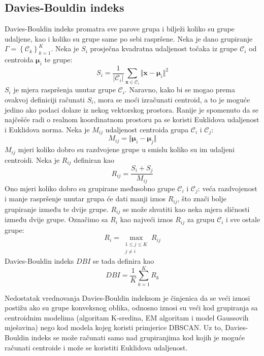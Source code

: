 \documentclass[times, utf8, zavrsni]{fer}
\begin{document}
\subsection{Davies-Bouldin indeks}
Davies-Bouldin indeks promatra sve parove grupa i bilježi koliko su grupe udaljene, kao i koliko su grupe same po sebi raspršene. Neka je dano grupiranje $\Gamma = \left\{\mathcal{C}_k\right\}_{k=1}^{K}$. Neka je $S_i$ prosječna kvadratna udaljenost točaka iz grupe $\mathcal{C}_i$ od centroida $\boldsymbol{\mu}_i$ te grupe:
\[S_i = \frac{1}{\left\vert \mathcal{C}_i \right\vert}
\sum_{\mathbf{x} \in \mathcal{C}_i} \Vert \mathbf{x} - \boldsymbol{\mu}_i  \Vert^2
\]
$S_i$ je mjera raspršenja unutar grupe $\mathcal{C}_i$. Naravno, kako bi se mogao prema ovakvoj definiciji računati $S_i$, mora se moći izračunati centroid, a to je moguće jedino ako podaci dolaze iz nekog vektorskog prostora. Ranije je spomenuto da se najčešće radi o realnom koordinatnom prostoru pa se koristi Euklidova udaljenost i Euklidova norma. Neka je $M_{ij}$ udaljenost centroida grupa $\mathcal{C}_i$ i $\mathcal{C}_j$:
\[M_{ij} = \Vert \boldsymbol{\mu}_i - \boldsymbol{\mu}_j \Vert\]
$M_{ij}$ mjeri koliko dobro su razdvojene grupe u smislu koliko su im udaljeni centroidi. Neka je $R_{ij}$ definiran kao
\[R_{ij} = \frac{S_i + S_j}{M_{ij}}\]
Ono mjeri koliko dobro su grupirane međusobno grupe $\mathcal{C}_i$ i $\mathcal{C}_j$: veća razdvojenost i manje raspršenje unutar grupa će dati manji iznos $R_{ij}$, što znači bolje grupiranje između te dvije grupe. $R_{ij}$ se može shvatiti kao neka mjera sličnosti između dvije grupe. Označimo sa $R_i$ kao najveći iznos $R_{ij}$ za grupu $\mathcal{C}_i$ i sve ostale grupe:
\[R_i = \max_{\substack{1 \leq j \leq K \\ j \neq i}} R_{ij}\]
Davies-Bouldin indeks $DBI$ se tada definira kao
\[DBI = \frac{1}{K} \sum_{k=1}^{K} R_k\]

Nedostatak vrednovanja Davies-Bouldin indeksom je činjenica da se veći iznosi postižu ako su grupe konveksnog oblika, odnosno iznosi su veći kod grupiranja sa centroidnim modelima (algoritam K-sredina, EM algoritam i model Gaussovih mješavina) nego kod modela kojeg koristi primjerice DBSCAN. Uz to, Davies-Bouldin indeks se može računati samo nad grupiranjima kod kojih je moguće računati centroide i može se koristiti Euklidova udaljenost.
\end{document}
